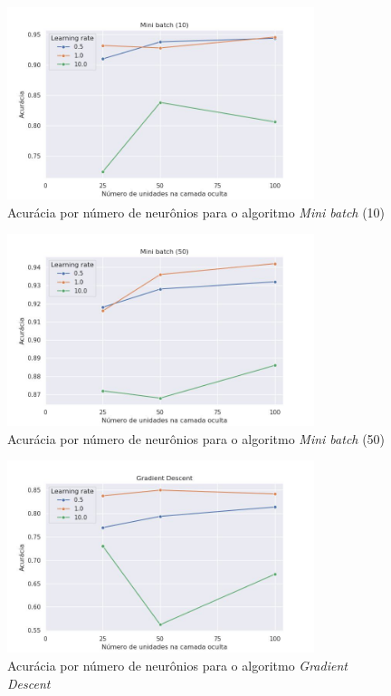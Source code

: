 \documentclass{article}
\begin{document}
\begin{figure}[H]
    \centering
    \includegraphics[width=0.8\textwidth]{images/tradeoff/MB10.jpg}
    \caption{Acurácia por número de neurônios para o algoritmo \textit{Mini batch} (10)}
\end{figure}

\begin{figure}[H]
    \centering
    \includegraphics[width=0.8\textwidth]{images/tradeoff/MB50.jpg}
    \caption{Acurácia por número de neurônios para o algoritmo \textit{Mini batch} (50)}
\end{figure}

\begin{figure}[H]
    \centering
    \includegraphics[width=0.8\textwidth]{images/tradeoff/GD.jpg}
    \caption{Acurácia por número de neurônios para o algoritmo \textit{Gradient Descent}}
\end{figure}
\end{document}
